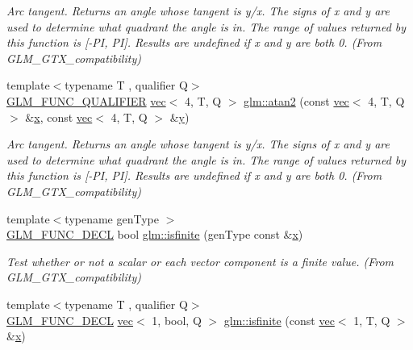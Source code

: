 \begin{DoxyCompactItemize}
\begin{DoxyCompactList}\small\item\em Arc tangent. Returns an angle whose tangent is y/x. The signs of x and y are used to determine what quadrant the angle is in. The range of values returned by this function is \mbox{[}-\/\+PI, PI\mbox{]}. Results are undefined if x and y are both 0. (From G\+L\+M\+\_\+\+G\+T\+X\+\_\+compatibility) \end{DoxyCompactList}\item 
{\footnotesize template$<$typename T , qualifier Q$>$ }\\\hyperlink{setup_8hpp_a33fdea6f91c5f834105f7415e2a64407}{G\+L\+M\+\_\+\+F\+U\+N\+C\+\_\+\+Q\+U\+A\+L\+I\+F\+I\+ER} \hyperlink{structglm_1_1vec}{vec}$<$ 4, T, Q $>$ \hyperlink{group__gtx__compatibility_gaba86c28da7bf5bdac64fecf7d56e8ff3}{glm\+::atan2} (const \hyperlink{structglm_1_1vec}{vec}$<$ 4, T, Q $>$ \&\hyperlink{_s_d_l__opengl_8h_ad0e63d0edcdbd3d79554076bf309fd47}{x}, const \hyperlink{structglm_1_1vec}{vec}$<$ 4, T, Q $>$ \&\hyperlink{_s_d_l__opengl_8h_a1675d9d7bb68e1657ff028643b4037e3}{y})
\begin{DoxyCompactList}\small\item\em Arc tangent. Returns an angle whose tangent is y/x. The signs of x and y are used to determine what quadrant the angle is in. The range of values returned by this function is \mbox{[}-\/\+PI, PI\mbox{]}. Results are undefined if x and y are both 0. (From G\+L\+M\+\_\+\+G\+T\+X\+\_\+compatibility) \end{DoxyCompactList}\item 
{\footnotesize template$<$typename gen\+Type $>$ }\\\hyperlink{setup_8hpp_ab2d052de21a70539923e9bcbf6e83a51}{G\+L\+M\+\_\+\+F\+U\+N\+C\+\_\+\+D\+E\+CL} bool \hyperlink{group__gtx__compatibility_gaf4b04dcd3526996d68c1bfe17bfc8657}{glm\+::isfinite} (gen\+Type const \&\hyperlink{_s_d_l__opengl_8h_ad0e63d0edcdbd3d79554076bf309fd47}{x})
\begin{DoxyCompactList}\small\item\em Test whether or not a scalar or each vector component is a finite value. (From G\+L\+M\+\_\+\+G\+T\+X\+\_\+compatibility) \end{DoxyCompactList}\item 
{\footnotesize template$<$typename T , qualifier Q$>$ }\\\hyperlink{setup_8hpp_ab2d052de21a70539923e9bcbf6e83a51}{G\+L\+M\+\_\+\+F\+U\+N\+C\+\_\+\+D\+E\+CL} \hyperlink{structglm_1_1vec}{vec}$<$ 1, bool, Q $>$ \hyperlink{group__gtx__compatibility_gac3b12b8ac3014418fe53c299478b6603}{glm\+::isfinite} (const \hyperlink{structglm_1_1vec}{vec}$<$ 1, T, Q $>$ \&\hyperlink{_s_d_l__opengl_8h_ad0e63d0edcdbd3d79554076bf309fd47}{x})

\end{DoxyCompactItemize}
